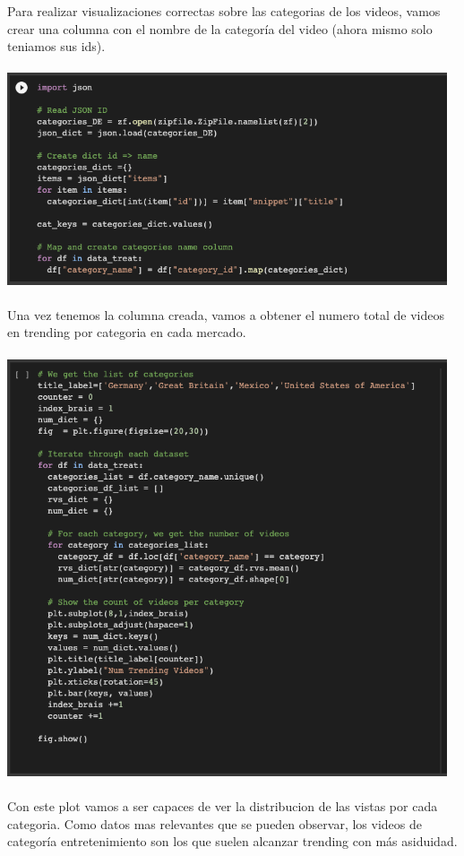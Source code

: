 \documentclass[a4paper,12pt]{article}
\begin{document}
Para realizar visualizaciones correctas sobre las categorias de los videos, vamos crear una columna con el nombre de la categor\'ia del video (ahora mismo solo teniamos sus ids).
\\
\\
\includegraphics[width=13cm]{categories_1.png}
\\
\\
Una vez tenemos la columna creada, vamos a obtener el numero total de videos en trending por categoria en cada mercado.
\\
\\
\includegraphics[width=13cm]{categories_2.png}
\\
\\
Con este plot vamos a ser capaces de ver la distribucion de las vistas por cada categoria. Como datos mas relevantes que se pueden observar, los videos de categor\'ia entretenimiento son los que suelen alcanzar trending con m\'as asiduidad.
\end{document}
